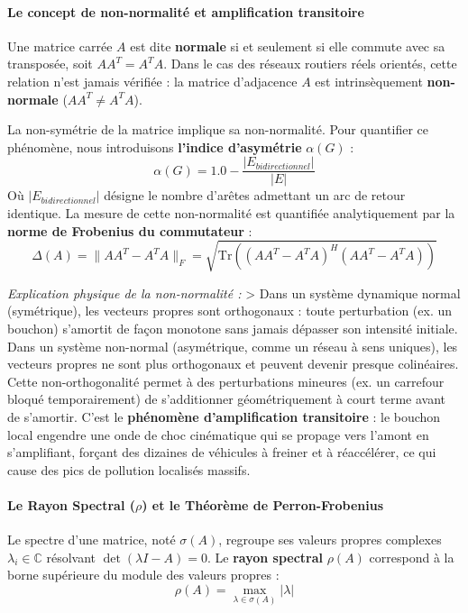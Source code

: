 \documentclass[10pt, a4paper]{article}
\begin{document}
\paragraph{Le concept de non-normalité et amplification
transitoire}\label{le-concept-de-non-normalituxe9-et-amplification-transitoire}

Une matrice carrée \(A\) est dite \textbf{normale} si et seulement si
elle commute avec sa transposée, soit \(A A^T = A^T A\). Dans le cas des
réseaux routiers réels orientés, cette relation n'est jamais vérifiée :
la matrice d'adjacence \(A\) est intrinsèquement \textbf{non-normale}
(\(A A^T \neq A^T A\)).

La non-symétrie de la matrice implique sa non-normalité. Pour quantifier
ce phénomène, nous introduisons \textbf{l'indice d'asymétrie}
\(\alpha(G)\) : \[\alpha(G) = 1.0 - \frac{|E_{bidirectionnel}|}{|E|}\]
Où \(|E_{bidirectionnel}|\) désigne le nombre d'arêtes admettant un arc
de retour identique. La mesure de cette non-normalité est quantifiée
analytiquement par la \textbf{norme de Frobenius du commutateur} :
\[\Delta(A) = \| A A^T - A^T A \|_F = \sqrt{\text{Tr}\left( (A A^T - A^T A)^H (A A^T - A^T A) \right)}\]

\emph{Explication physique de la non-normalité :} \textgreater{} Dans un
système dynamique normal (symétrique), les vecteurs propres sont
orthogonaux : toute perturbation (ex. un bouchon) s'amortit de façon
monotone sans jamais dépasser son intensité initiale. Dans un système
non-normal (asymétrique, comme un réseau à sens uniques), les vecteurs
propres ne sont plus orthogonaux et peuvent devenir presque colinéaires.
Cette non-orthogonalité permet à des perturbations mineures (ex. un
carrefour bloqué temporairement) de s'additionner géométriquement à
court terme avant de s'amortir. C'est le \textbf{phénomène
d'amplification transitoire} : le bouchon local engendre une onde de
choc cinématique qui se propage vers l'amont en s'amplifiant, forçant
des dizaines de véhicules à freiner et à réaccélérer, ce qui cause des
pics de pollution localisés massifs.

\paragraph{\texorpdfstring{Le Rayon Spectral (\(\rho\)) et le Théorème
de
Perron-Frobenius}{Le Rayon Spectral (\textbackslash rho) et le Théorème de Perron-Frobenius}}\label{le-rayon-spectral-rho-et-le-thuxe9oruxe8me-de-perron-frobenius}

Le spectre d'une matrice, noté \(\sigma(A)\), regroupe ses valeurs
propres complexes \(\lambda_i \in \mathbb{C}\) résolvant
\(\det(\lambda I - A) = 0\). Le \textbf{rayon spectral} \(\rho(A)\)
correspond à la borne supérieure du module des valeurs propres :
\[\rho(A) = \max_{\lambda \in \sigma(A)} |\lambda|\]
\end{document}
